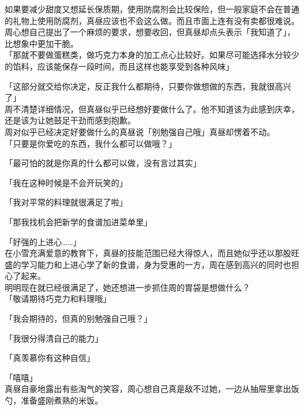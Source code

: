 如果要减少甜度又想延长保质期，使用防腐剂会比较保险，但一般家庭不会在普通的礼物上使用防腐剂，真昼应该也不会这么做。而且市面上连有没有卖都很难说。\\

周心想自己提出了一个麻烦的要求，想要收回，但真昼却点头表示「我知道了」，比想象中更加干脆。\\

「那就不要做蛋糕类，做巧克力本身的加工点心比较好。如果尽可能选择水分较少的馅料，应该能保存一段时间，而且这样也能享受到各种风味」

「这部分就交给你决定，反正我什么都期待，只要你做想做的东西，我就很高兴了」\\

周不清楚详细情况，但真昼似乎已经想好要做什么了。他不知道该为此感到庆幸，还是该为让她鼓足干劲而感到抱歉。\\

周对似乎已经决定好要做什么的真昼说「别勉强自己哦」真昼却愣着不动。\\

「只要是你爱吃的东西，我什么都可以做哦？」

「最可怕的就是你真的什么都可以做，没有言过其实」

「我在这种时候是不会开玩笑的」

「我对平常的料理就很满足了啦」

「那我找机会把新学的食谱加进菜单里」

「好强的上进心……」\\

在小雪充满爱意的教育下，真昼的技能范围已经大得惊人，而且她似乎还以那股旺盛的学习能力和上进心学了新的食谱，身为受惠的一方，周在感到高兴的同时也担心了起来。\\

明明现在就已经很满足了，她还想进一步抓住周的胃袋是想做什么？\\

「敬请期待巧克力和料理哦」

「我会期待的，但真的别勉强自己哦？」

「我很分得清自己的能力」

「真羡慕你有这种自信」

「嘻嘻」\\

真昼自豪地露出有些淘气的笑容，周心想自己真是敌不过她，一边从抽屉里拿出饭勺，准备盛刚煮熟的米饭。
